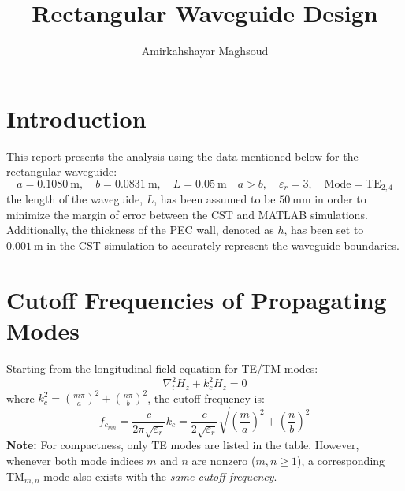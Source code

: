 \documentclass[a4paper,11pt]{article}
\title{\textbf{Rectangular Waveguide Design}}
\author{Amirkahshayar Maghsoud }
\date{}
\begin{document}
\maketitle

\section{Introduction}
This report presents the analysis using the data mentioned below for the rectangular waveguide:
\[
a = 0.1080~\text{m}, \quad b = 0.0831~\text{m},\quad L = 0.05~\text{m} \quad a > b, \quad  \varepsilon_r=3, \quad \text{Mode} = \text{TE}_{2,4}
\]
the length of the waveguide, $L$, has been assumed to be $50~\text{mm}$ in order to minimize the margin of error between the CST and MATLAB simulations. Additionally, the thickness of the PEC wall, denoted as $h$, has been set to $0.001~\text{m}$ in the CST simulation to accurately represent the waveguide boundaries.

\section{ Cutoff Frequencies of Propagating Modes}
Starting from the longitudinal field equation for TE/TM modes:
\[
\nabla_t^2 H_z + k_c^2 H_z = 0
\]
where \( k_c^2 = \left( \frac{m\pi}{a} \right)^2 + \left( \frac{n\pi}{b} \right)^2 \),
the cutoff frequency is:
\[
f_{c_{mn}} = \frac{c}{2\pi \sqrt{\varepsilon_r}} k_c = 
\frac{c}{2\sqrt{\varepsilon_r}} 
\sqrt{\left( \frac{m}{a} \right)^2 + \left( \frac{n}{b} \right)^2}
\]
\noindent\textbf{Note:} For compactness, only TE modes are listed in the table. 
However, whenever both mode indices $m$ and $n$ are nonzero ($m,n \ge 1$), 
a corresponding TM$_{m,n}$ mode also exists with the \emph{same cutoff frequency}. 
\end{document}
